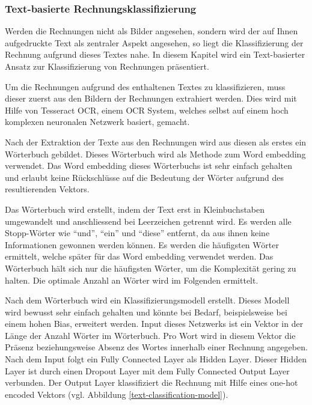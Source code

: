 \subsubsection{Text-basierte Rechnungsklassifizierung}
\label{chap:text-based-classification}

Werden die Rechnungen nicht als Bilder angesehen, sondern wird der auf Ihnen aufgedruckte Text als zentraler Aspekt angesehen, so liegt die Klassifizierung der Rechnung aufgrund dieses Textes nahe. In diesem Kapitel wird ein Text-basierter Ansatz zur Klassifizierung von Rechnungen präsentiert. 

Um die Rechnungen aufgrund des enthaltenen Textes zu klassifizieren, muss dieser zuerst aus den Bildern der Rechnungen extrahiert werden. Dies wird mit Hilfe von Tesseract OCR, einem OCR System, welches selbst auf einem hoch komplexen neuronalen Netzwerk basiert, gemacht.

Nach der Extraktion der Texte aus den Rechnungen wird aus diesen als erstes ein Wörterbuch gebildet. Dieses Wörterbuch wird als Methode zum Word embedding verwendet. Das Word embedding dieses Wörterbuchs ist sehr einfach gehalten und erlaubt keine Rückschlüsse auf die Bedeutung der Wörter aufgrund des resultierenden Vektors.

Das Wörterbuch wird erstellt, indem der Text erst in Kleinbuchstaben umgewandelt und anschliessend bei Leerzeichen getrennt wird. Es werden alle Stopp-Wörter wie \enquote{und}, \enquote{ein} und \enquote{diese} entfernt, da aus ihnen keine Informationen gewonnen werden können. Es werden die häufigsten Wörter ermittelt, welche später für das Word embedding verwendet werden. Das Wörterbuch hält sich nur die häufigsten Wörter, um die Komplexität gering zu halten. Die optimale Anzahl an Wörter wird im Folgenden ermittelt.

Nach dem Wörterbuch wird ein Klassifizierungsmodell erstellt. Dieses Modell wird bewusst sehr einfach gehalten und könnte bei Bedarf, beispielsweise bei einem hohen Bias, erweitert werden. Input dieses Netzwerks ist ein Vektor in der Länge der Anzahl Wörter im Wörterbuch. Pro Wort wird in diesem Vektor die Präsenz beziehungsweise Absenz des Wortes innerhalb einer Rechnung angegeben. Nach dem Input folgt ein Fully Connected Layer als Hidden Layer. Dieser Hidden Layer ist durch einen Dropout Layer mit dem Fully Connected Output Layer verbunden. Der Output Layer klassifiziert die Rechnung mit Hilfe eines one-hot encoded Vektors (vgl. Abbildung \ref{text-classification-model}). 

